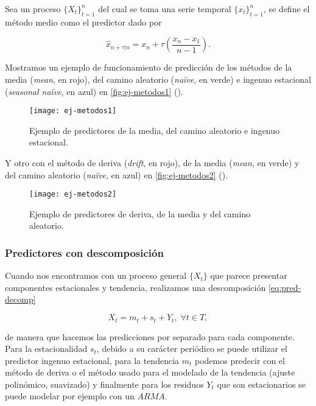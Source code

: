 \begin{definicion}
  Sea un proceso $\{X_t\}_{t = 1}^n$ del cual se toma una serie temporal $\{x_t\}_{t = 1}^n$, se define el método medio como el predictor dado por

  $$\hat{x}_{n + \tau | n} = x_n + \tau \left(\dfrac{x_n - x_1}{n - 1}\right).$$
  \label{def:metodo-deriva}
\end{definicion}

Mostramos un ejemplo de funcionamiento de predicción de los métodos de la media (\emph{mean}, en rojo), del camino aleatorio (\emph{naïve}, en verde) e ingenuo estacional (\emph{seasonal naïve}, en azul) en \autoref{fig:ej-metodos1} (\cite{hyndman2018forecasting}).

\begin{figure}[htpb]
  \centering
  \texttt{[image: ej-metodos1]}
  \caption{Ejemplo de predictores de la media, del camino aleatorio e ingenuo estacional.}
  \label{fig:ej-metodos1}
\end{figure}

Y otro con el método de deriva (\emph{drift}, en rojo), de la media (\emph{mean}, en verde) y del camino aleatorio (\emph{naïve}, en azul) en \autoref{fig:ej-metodos2} (\cite{hyndman2018forecasting}).

\begin{figure}[htpb]
  \centering
  \texttt{[image: ej-metodos2]}
  \caption{Ejemplo de predictores de deriva, de la media y del camino aleatorio.}
  \label{fig:ej-metodos2}
\end{figure}

\subsubsection{Predictores con descomposición}

Cuando nos encontramos con un proceso general $\{X_t\}$ que parece presentar componentes estacionales y tendencia, realizamos una descomposición \eqref{eq:pred-decomp}

\begin{equation}
  X_t = m_t + s_t + Y_t, \; \forall t \in T,
  \label{eq:pred-decomp}
\end{equation}

de manera que hacemos las predicciones por separado para cada componente. Para la estacionalidad $s_t$, debido a su carácter periódico se puede utilizar el predictor ingenuo estacional, para la tendencia $m_t$ podemos predecir con el método de deriva o el método usado para el modelado de la tendencia (ajuste polinómico, suavizado) y finalmente para los residuos $Y_t$ que son estacionarios se puede modelar por ejemplo con un $ARMA$.

